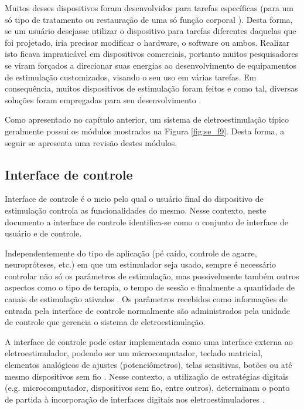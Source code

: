 Muitos desses dispositivos foram desenvolvidos para tarefas específicas (para um só tipo de tratamento ou restauração de uma só função corporal \cite{Brunetti2011EnhancingProject,Souza2017PowerSystems}).  %
Desta forma, se um usuário desejasse utilizar o dispositivo para tarefas diferentes daquelas que foi projetado, iria precisar modificar o hardware, o software ou ambos. Realizar isto ficava impraticável em dispositivos comerciais, portanto muitos pesquisadores se viram forçados a direcionar suas energias ao desenvolvimento de equipamentos de estimulação customizados, visando o seu uso em várias tarefas. Em consequência, muitos dispositivos de estimulação foram feitos e como tal, diversas soluções foram empregadas para seu desenvolvimento \cite{Ilic1994ASystems, Popovic2001CompexApplications}. %

Como apresentado no capítulo anterior, um sistema de eletroestimulação típico geralmente possui os módulos mostrados na Figura \ref{fig:se_f9}. Desta forma, a seguir se apresenta uma revisão destes módulos.

\subsection{Interface de controle}
Interface de controle é o meio pelo qual o usuário final do dispositivo de estimulação controla as funcionalidades do mesmo. Nesse contexto, neste documento a interface de controle identifica-se como o conjunto de interface de usuário e de controle. 

Independentemente do tipo de aplicação (pé caído, controle de agarre, neuropróteses, etc.) em que um estimulador seja usado, sempre é necessário controlar não só os parâmetros de estimulação, mas possivelmente também outros aspectos como o tipo de terapia, o tempo de sessão e finalmente a quantidade de canais de estimulação ativados \cite{Gaiotto2012EstimuladorEletricamente}. Os parâmetros recebidos como informações de entrada pela interface de controle normalmente são administrados pela unidade de controle que gerencia o sistema de eletroestimulação.

A interface de controle pode estar implementada como uma interface externa ao eletroestimulador, podendo ser um microcomputador, teclado matricial, elementos analógicos de ajustes (potenciômetros), telas sensitivas, botões ou até mesmo dispositivos sem fio \cite{Gaiotto2012EstimuladorEletricamente}. Nesse contexto, a utilização de estratégias digitais (e.g. microcomputador, dispositivos sem fio, entre outros), determinam o ponto de partida à incorporação de interfaces digitais nos eletroestimuladores \cite{Bijak2002TheParaplegia}.

